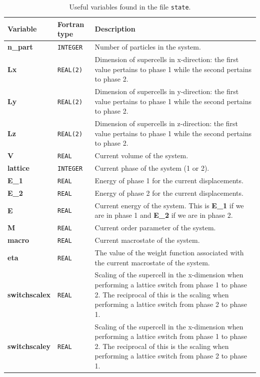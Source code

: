 \documentclass{report}
\begin{document}
\begin{landscape}
\begin{center}\label{table:state_variables}
\begin{longtable}{ l l p{8cm}}
\caption{Useful variables found in the file \texttt{state}.}
\\

Variable & Fortran type & Description \\
\hline
\textbf{n\_part} & \texttt{INTEGER} & Number of particles in the system. \\
\textbf{Lx} & \texttt{REAL(2)} & Dimension of supercells in x-direction: the first value pertains to phase 1 while the second pertains to phase 2.\\
\textbf{Ly} & \texttt{REAL(2)} & Dimension of supercells in y-direction: the first value pertains to phase 1 while the second pertains to phase 2.\\
\textbf{Lz} & \texttt{REAL(2)} & Dimension of supercells in z-direction: the first value pertains to phase 1 while the second pertains to phase 2.\\
\textbf{V} & \texttt{REAL} & Current volume of the system.\\
\textbf{lattice} & \texttt{INTEGER} & Current phase of the system (1 or 2).\\
\textbf{E\_1} & \texttt{REAL} & Energy of phase 1 for the current displacements. \\
\textbf{E\_2} & \texttt{REAL} & Energy of phase 2 for the current displacements. \\
\textbf{E} & \texttt{REAL} & Current energy of the system. This is \textbf{E\_1} if we are in phase 1 and \textbf{E\_2} if we are in phase 2.\\
\textbf{M} & \texttt{REAL} & Current order parameter of the system.\\
\textbf{macro} & \texttt{REAL} & Current macrostate of the system.\\
\textbf{eta} & \texttt{REAL} & The value of the weight function associated with the current macrostate of the system.\\
\textbf{switchscalex} & \texttt{REAL} & Scaling of the supercell in the x-dimension when performing a lattice switch from phase 1 to phase 2. The 
reciprocal of this is the scaling when performing a lattice switch from phase 2 to phase 1.\\
\textbf{switchscaley} & \texttt{REAL} & Scaling of the supercell in the x-dimension when performing a lattice switch from phase 1 to phase 2. The 
reciprocal of this is the scaling when performing a lattice switch from phase 2 to phase 1. \\

\end{longtable}
\end{center}
\end{landscape}
\end{document}

